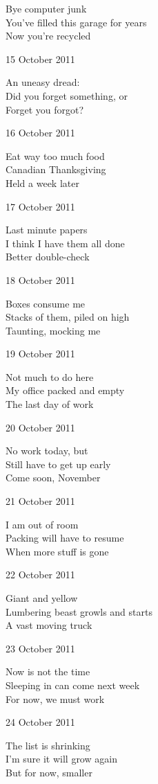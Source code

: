 \documentclass[12pt]{article}
\begin{document}
Bye computer junk \\
You've filled this garage for years \\
Now you're recycled

15 October 2011

An uneasy dread: \\
Did you forget something, or \\
Forget you forgot?

16 October 2011

Eat way too much food \\
Canadian Thanksgiving \\
Held a week later

17 October 2011

Last minute papers \\
I think I have them all done \\
Better double-check

\newpage

18 October 2011

Boxes consume me \\
Stacks of them, piled on high \\
Taunting, mocking me

19 October 2011

Not much to do here \\
My office packed and empty \\
The last day of work

20 October 2011

No work today, but \\
Still have to get up early \\
Come soon, November

21 October 2011

I am out of room \\
Packing will have to resume \\
When more stuff is gone

22 October 2011

Giant and yellow \\
Lumbering beast growls and starts \\
A vast moving truck

23 October 2011

Now is not the time \\
Sleeping in can come next week \\
For now, we must work

24 October 2011

The list is shrinking \\
I'm sure it will grow again \\
But for now, smaller
\end{document}
